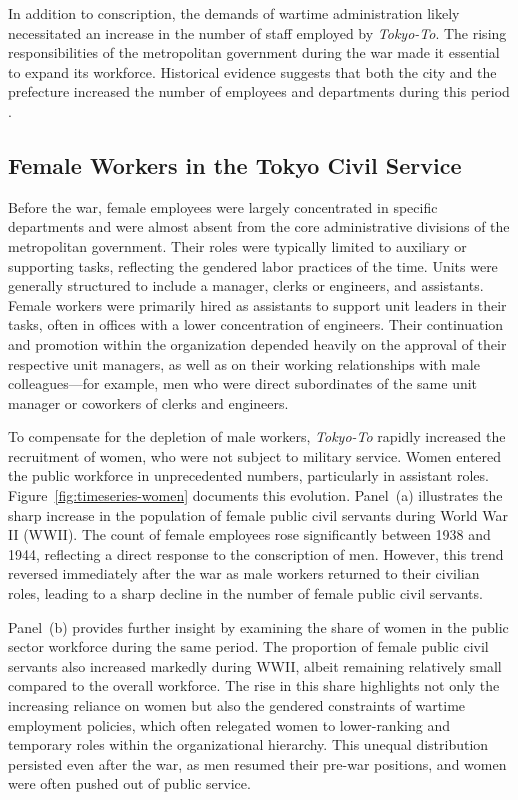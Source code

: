 In addition to conscription, the demands of wartime administration likely necessitated an increase in the number of staff employed by \emph{Tokyo-To}. The rising responsibilities of the metropolitan government during the war made it essential to expand its workforce. Historical evidence suggests that both the city and the prefecture increased the number of employees and departments during this period \citep{CompilationofHistoricalMaterialsofTokyoII}.

\subsection{Female Workers in the Tokyo Civil Service}

Before the war, female employees were largely concentrated in specific departments and were almost absent from the core administrative divisions of the metropolitan government. Their roles were typically limited to auxiliary or supporting tasks, reflecting the gendered labor practices of the time. Units were generally structured to include a manager, clerks or engineers, and assistants. Female workers were primarily hired as assistants to support unit leaders in their tasks, often in offices with a lower concentration of engineers. Their continuation and promotion within the organization depended heavily on the approval of their respective unit managers, as well as on their working relationships with male colleagues---for example, men who were direct subordinates of the same unit manager or coworkers of clerks and engineers.

To compensate for the depletion of male workers, \emph{Tokyo-To} rapidly increased the recruitment of women, who were not subject to military service. Women entered the public workforce in unprecedented numbers, particularly in assistant roles. Figure~\ref{fig:timeseries-women} documents this evolution. Panel~(a) illustrates the sharp increase in the population of female public civil servants during World War II (WWII). The count of female employees rose significantly between 1938 and 1944, reflecting a direct response to the conscription of men. However, this trend reversed immediately after the war as male workers returned to their civilian roles, leading to a sharp decline in the number of female public civil servants.

Panel~(b) provides further insight by examining the share of women in the public sector workforce during the same period. The proportion of female public civil servants also increased markedly during WWII, albeit remaining relatively small compared to the overall workforce. The rise in this share highlights not only the increasing reliance on women but also the gendered constraints of wartime employment policies, which often relegated women to lower-ranking and temporary roles within the organizational hierarchy. This unequal distribution persisted even after the war, as men resumed their pre-war positions, and women were often pushed out of public service.

